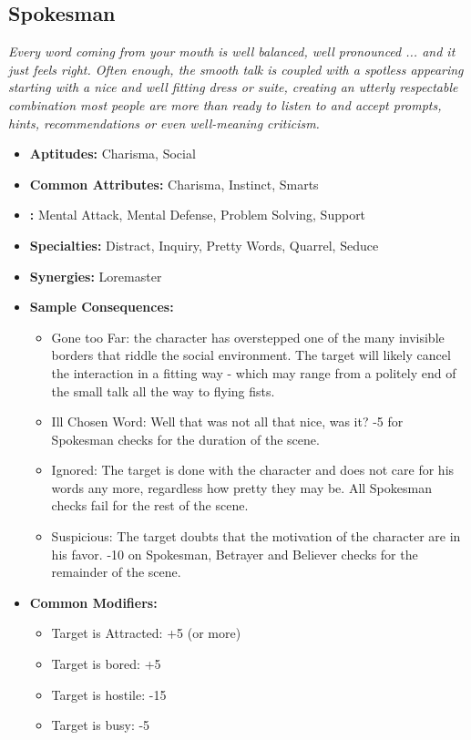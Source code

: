 \subsection{Spokesman}\label{Spokesman}
\textit{Every word coming from your mouth is well balanced, well pronounced ... and it just feels right.
Often enough, the smooth talk is coupled with a spotless appearing starting with a nice and well fitting dress or suite, creating an utterly respectable combination most people are more than ready to listen to and accept prompts, hints, recommendations or even well-meaning criticism.}
\begin{itemize}
	\item \textbf{Aptitudes:} Charisma, Social
	\item \textbf{Common Attributes:} Charisma, Instinct, Smarts
	\item \textbf{:} Mental Attack, Mental Defense, Problem Solving, Support
	\item \textbf{Specialties:} Distract, Inquiry, Pretty Words, Quarrel, Seduce
	\item \textbf{Synergies:} Loremaster
	\item \textbf{Sample Consequences:} 
	\begin{itemize}
		\item Gone too Far: the character has overstepped one of the many invisible borders that riddle the social environment. The target will likely cancel the interaction in a fitting way - which may range from a politely end of the small talk all the way to flying fists.
		\item Ill Chosen Word: Well that was not all that nice, was it? -5 for Spokesman checks for the duration of the scene.
		\item Ignored: The target is done with the character and does not care for his words any more, regardless how pretty they may be. All Spokesman checks fail for the rest of the scene.
		\item Suspicious: The target doubts that the motivation of the character are in his favor. -10 on Spokesman, Betrayer and Believer checks for the remainder of the scene.
	\end{itemize}
	\item \textbf{Common Modifiers:}
	\begin{itemize}
		\item Target is Attracted: +5 (or more)
		\item Target is bored: +5
		\item Target is hostile: -15
		\item Target is busy: -5
	\end{itemize}
\end{itemize}

